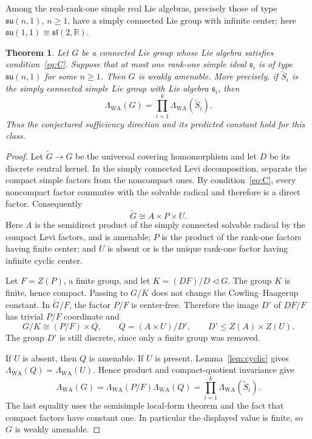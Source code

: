 \documentclass[11pt]{article}
\newtheorem{theorem}{Theorem}
\newcommand{\WA}{\mathrm{WA}}
\begin{document}
Among the real-rank-one simple real Lie algebras, precisely those of type
$\mathfrak{su}(n,1)$, $n\geq1$, have a simply connected Lie group with
infinite center; here $\mathfrak{su}(1,1)\cong\mathfrak{sl}(2,\mathbb R)$.

\begin{theorem}\label{thm:main}
Let $G$ be a connected Lie group whose Lie algebra satisfies
condition~\eqref{eq:C}.  Suppose that at most one rank-one simple ideal
$\mathfrak s_i$ is of type $\mathfrak{su}(n,1)$ for some $n\geq1$.
Then $G$ is weakly amenable.  More precisely, if $\widetilde S_i$ is the
simply connected simple Lie group with Lie algebra $\mathfrak s_i$, then
\[
 \Lambda_{\WA}(G)=\prod_{i=1}^k
 \Lambda_{\WA}(\widetilde S_i).
\]
Thus the conjectured sufficiency direction and its predicted constant hold
for this class.
\end{theorem}

\begin{proof}
Let $\widetilde G\to G$ be the universal covering homomorphism and let $D$
be its discrete central kernel.  In the simply connected Levi decomposition,
separate the compact simple factors from the noncompact ones.  By
condition~\eqref{eq:C}, every noncompact factor commutes with the solvable
radical and therefore is a direct factor.  Consequently
\[
 \widetilde G\cong A\times P\times U.
\]
Here $A$ is the semidirect product of the simply connected solvable radical
by the compact Levi factors, and is amenable; $P$ is the product of the
rank-one factors having finite center; and $U$ is absent or is the unique
rank-one factor having infinite cyclic center.

Let $F=Z(P)$, a finite group, and let $K=(DF)/D\triangleleft G$.  The group
$K$ is finite, hence compact.  Passing to $G/K$ does not change the
Cowling--Haagerup constant.  In $\widetilde G/F$, the factor $P/F$ is
center-free.  Therefore the image $D'$ of $DF/F$ has trivial $P/F$
coordinate and
\[
 G/K\cong (P/F)\times Q,
 \qquad Q=(A\times U)/D',
 \qquad D'\leq Z(A)\times Z(U).
\]
The group $D'$ is still discrete, since only a finite group was removed.

If $U$ is absent, then $Q$ is amenable.  If $U$ is present,
Lemma~\ref{lem:cyclic} gives
$\Lambda_{\WA}(Q)=\Lambda_{\WA}(U)$.  Hence product and compact-quotient
invariance give
\[
 \Lambda_{\WA}(G)
 =\Lambda_{\WA}(P/F)\Lambda_{\WA}(Q)
 =\prod_{i=1}^k\Lambda_{\WA}(\widetilde S_i).
\]
The last equality uses the semisimple local-form theorem and the fact that
compact factors have constant one.  In particular the displayed value is
finite, so $G$ is weakly amenable.
\end{proof}
\end{document}
